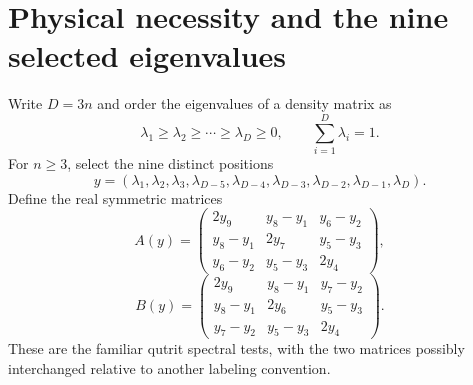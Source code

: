 \documentclass[11pt]{article}
\theoremstyle{remark}\newtheorem{remark}[theorem]{Remark}
\begin{document}
\section{Physical necessity and the nine selected eigenvalues}\label{sec:necessity}
Write $D=3n$ and order the eigenvalues of a density matrix as
\begin{equation}\label{eq:spectrum}
 \lambda_1\geq\lambda_2\geq\cdots\geq\lambda_D\geq0,
 \qquad \sum_{i=1}^D\lambda_i=1.
\end{equation}
For $n\geq3$, select the nine distinct positions
\begin{equation}\label{eq:outer}
 y=(\lambda_1,\lambda_2,\lambda_3,
       \lambda_{D-5},\lambda_{D-4},\lambda_{D-3},
       \lambda_{D-2},\lambda_{D-1},\lambda_D).
\end{equation}
Define the real symmetric matrices
\begin{equation}\label{eq:A}
 A(y)=\begin{pmatrix}
 2y_9&y_8-y_1&y_6-y_2\\
 y_8-y_1&2y_7&y_5-y_3\\
 y_6-y_2&y_5-y_3&2y_4
 \end{pmatrix},
\end{equation}
\begin{equation}\label{eq:B}
 B(y)=\begin{pmatrix}
 2y_9&y_8-y_1&y_7-y_2\\
 y_8-y_1&2y_6&y_5-y_3\\
 y_7-y_2&y_5-y_3&2y_4
 \end{pmatrix}.
\end{equation}
These are the familiar qutrit spectral tests, with the two matrices possibly interchanged relative to another labeling convention.
\end{document}
